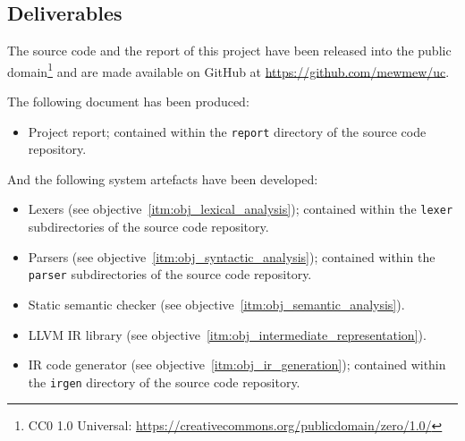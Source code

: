 
\subsection{Deliverables}
\label{sec:intro_deliverables}

The source code and the report of this project have been released into the public domain\footnote{CC0 1.0 Universal: \url{https://creativecommons.org/publicdomain/zero/1.0/}} and are made available on GitHub at \url{https://github.com/mewmew/uc}.

The following document has been produced:

\begin{itemize}
	\item Project report; contained within the \texttt{report} directory of the source code repository.
\end{itemize}

And the following system artefacts have been developed:

\begin{itemize}
	\item Lexers (see objective~\ref{itm:obj_lexical_analysis}); contained within the \texttt{lexer} subdirectories of the source code repository.
	\item Parsers (see objective~\ref{itm:obj_syntactic_analysis}); contained within the \texttt{parser} subdirectories of the source code repository.
	\item Static semantic checker (see objective~\ref{itm:obj_semantic_analysis}).
	\item LLVM IR library (see objective~\ref{itm:obj_intermediate_representation}).
	\item IR code generator (see objective~\ref{itm:obj_ir_generation}); contained within the \texttt{irgen} directory of the source code repository.
\end{itemize}
